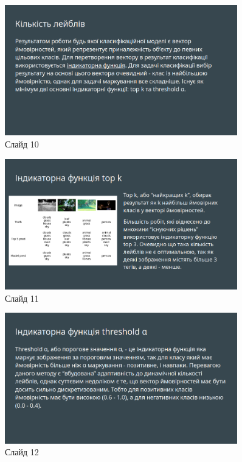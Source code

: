 \documentclass{udstu}
\begin{document}
\begin{figure}[!ht]
	\centering
	\includegraphics[width=0.9\textwidth]{PNG/present/present-10}
	\caption{Слайд 10}
\end{figure}

\begin{figure}[!ht]
	\centering
	\includegraphics[width=0.9\textwidth]{PNG/present/present-11}
	\caption{Слайд 11}
\end{figure}

\begin{figure}[!ht]
	\centering
	\includegraphics[width=0.9\textwidth]{PNG/present/present-12}
	\caption{Слайд 12}
\end{figure}
\end{document}
